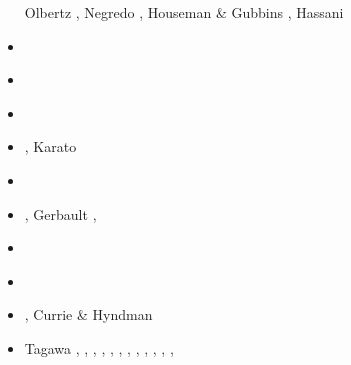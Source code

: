 \begin{scriptsize}
\begin{itemize}
                            Olbertz \etal \cite{olwh97}, Negredo \etal \cite{nesg97}, 
                            Houseman \& Gubbins \cite{hogu97}, Hassani \etal \cite{hajc97}
\item[\nineteenninetyeight] \cite{itki98}\cite{buwg98}
                            \cite{brmy98}\cite{jabf98}
                            \cite{wabb98}
\item[\nineteenninetynine] \cite{hagu99}\cite{befo99}
                           \cite{bumo99}\cite{roda99}
                           \cite{elbp99}\cite{scmr99}
                           \cite{elbe99}\cite{beep99}
                           \cite{nesb99}
\item[\twothousand] \cite{tesc00}\cite{brky00}
                    \cite{bemh00}\cite{chlb00}
\item[\twothousandone] \cite{bujl01}\cite{bugw01}
                       \cite{chys01}\cite{coha01}, 
                       Karato \etal \cite{kary01}
\item[\twothousandtwo] \cite{civv02}\cite{clbb02}
                       \cite{gesp02}\cite{ster02}
                       \cite{jabn02}
\item[\twothousandthree] \cite{refm03}\cite{fumr03}, 
                         Gerbault \etal \cite{gehd03}, \cite{bigs03}
\item[\twothousandfour] \cite{toba04}\cite{bocj04}
                        \cite{bejn04}\cite{tobj04}
                        \cite{sche04}\cite{sche04b}
                        \cite{enwi04}\cite{geys04}
\item[\twothousandfive] \cite{jalo05}\cite{lahb05}
                        \cite{gowo05}\cite{enbs05}
                        \cite{artd05}\cite{gowo05}
                        \cite{mage05}\cite{stge05}
                        \cite{sche05}\cite{lahb05}
\item[\twothousandsix] \cite{degw06}\cite{rohu06}
                       \cite{masr06}\cite{gest06}
                       \cite{fump06}\cite{pibf06}
                       \cite{stfs06}\cite{libi06}
                       \cite{hapf06}\cite{sobk06}
                       \cite{syab06}, Currie \& Hyndman \cite{cuhy06}
\item[\twothousandseven] Tagawa \etal \cite{tank07}, \cite{artd07},
                         \cite{yaab07}, \cite{cubh07},
                         \cite{civv07}, \cite{masp07},
                         \cite{camg07}, \cite{scfs07},
                         \cite{gogg07}, \cite{gowg07},
                         \cite{magu07}, \cite{moct07},

\end{itemize}
\end{scriptsize}

